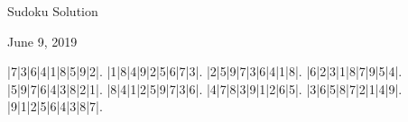 \documentclass{article}
\begin{document}
\begin{center}
\Huge{Sudoku Solution}
\end{center}
\begin{center}
\Large{June 9, 2019}
\end{center}
\begin{sudoku}
|7|3|6|4|1|8|5|9|2|.
|1|8|4|9|2|5|6|7|3|.
|2|5|9|7|3|6|4|1|8|.
|6|2|3|1|8|7|9|5|4|.
|5|9|7|6|4|3|8|2|1|.
|8|4|1|2|5|9|7|3|6|.
|4|7|8|3|9|1|2|6|5|.
|3|6|5|8|7|2|1|4|9|.
|9|1|2|5|6|4|3|8|7|.
\end{sudoku}
\end{document}
